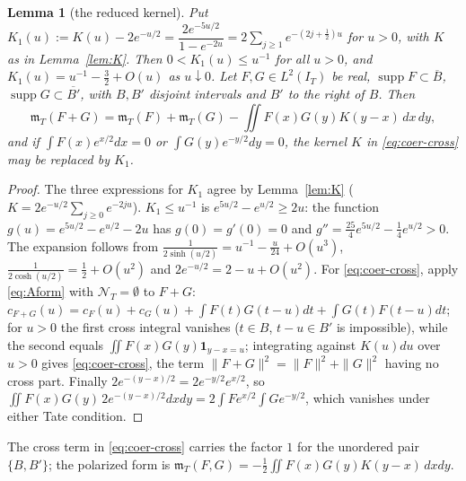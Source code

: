\documentclass[10pt]{amsart}
\newtheorem{lemma}[theorem]{Lemma}
\theoremstyle{definition}
\theoremstyle{remark}
\newcommand{\supp}{\operatorname{supp}}
\newcommand{\IT}{I_T}
\newcommand{\cF}{c_F}
\newcommand{\NT}{\mathcal N_T}
\newcommand{\mT}{\mathfrak m_T}
\begin{document}
\begin{lemma}[the reduced kernel]\label{lem:coer-K1}
Put $K_1(u):=K(u)-2e^{-u/2}=\dfrac{2e^{-5u/2}}{1-e^{-2u}}=2\sum_{j\ge1}e^{-(2j+\frac12)u}$ for $u>0$, with $K$ as in
Lemma~\ref{lem:K}. Then $0<K_1(u)\le u^{-1}$ for all $u>0$, and $K_1(u)=u^{-1}-\frac32+O(u)$ as $u\downarrow0$. Let
$F,G\in L^2(\IT)$ be real, $\supp F\subset\overline B$, $\supp G\subset\overline{B'}$, with $B,B'$ disjoint intervals and $B'$
to the right of $B$. Then
\begin{equation}\label{eq:coer-cross}
\mT(F+G)=\mT(F)+\mT(G)-\iint F(x)G(y)K(y-x)\,dx\,dy ,
\end{equation}
and if $\int F(x)e^{x/2}dx=0$ or $\int G(y)e^{-y/2}dy=0$, the kernel $K$ in \eqref{eq:coer-cross} may be replaced by $K_1$.
\end{lemma}
\begin{proof}
The three expressions for $K_1$ agree by Lemma~\ref{lem:K} ($K=2e^{-u/2}\sum_{j\ge0}e^{-2ju}$). $K_1\le u^{-1}$ is
$e^{5u/2}-e^{u/2}\ge2u$: the function $g(u)=e^{5u/2}-e^{u/2}-2u$ has $g(0)=g'(0)=0$ and
$g''=\frac{25}4e^{5u/2}-\frac14e^{u/2}>0$. The expansion follows from $\frac1{2\sinh(u/2)}=u^{-1}-\frac u{24}+O(u^3)$,
$\frac1{2\cosh(u/2)}=\frac12+O(u^2)$ and $2e^{-u/2}=2-u+O(u^2)$. For \eqref{eq:coer-cross}, apply \eqref{eq:Aform} with
$\NT=\emptyset$ to $F+G$: $c_{F+G}(u)=\cF(u)+c_G(u)+\int F(t)G(t-u)dt+\int G(t)F(t-u)dt$; for $u>0$ the first cross
integral vanishes ($t\in B$, $t-u\in B'$ is impossible), while the second equals $\iint F(x)G(y)\mathbf 1_{y-x=u}$; integrating
against $K(u)du$ over $u>0$ gives \eqref{eq:coer-cross}, the term $\|F+G\|^2=\|F\|^2+\|G\|^2$ having no cross part.
Finally $2e^{-(y-x)/2}=2e^{-y/2}e^{x/2}$, so $\iint F(x)G(y)\,2e^{-(y-x)/2}dxdy=2\int Fe^{x/2}\int Ge^{-y/2}$, which vanishes
under either Tate condition.
\end{proof}
The cross term in \eqref{eq:coer-cross} carries the factor $1$ for the unordered pair $\{B,B'\}$; the polarized form is
$\mT(F,G)=-\frac12\iint F(x)G(y)K(y-x)\,dxdy$.
\end{document}
